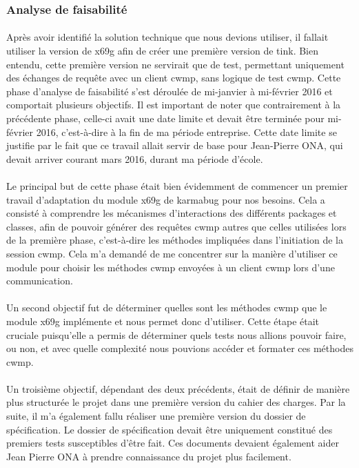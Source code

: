 \documentclass[12pt,a4paper]{report}
\begin{document}
\subsubsection{Analyse de faisabilité}
\paragraph*{}Après avoir identifié la solution technique que nous devions utiliser, il
fallait utiliser la version de \gls{x69g} afin de créer une première version de \gls{tink}. Bien entendu, cette première version ne servirait que de test, permettant uniquement des échanges de requête avec un client \gls{cwmp}, sans logique de test \gls{cwmp}. Cette phase d’analyse de faisabilité s’est déroulée de mi-janvier à mi-février 2016 et comportait plusieurs objectifs. Il est important de noter que contrairement à la précédente phase, celle-ci avait une date limite et devait être terminée pour mi-février 2016, c’est-à-dire à la fin de ma période entreprise. Cette date limite se justifie par le fait que ce travail allait servir de base pour Jean-Pierre ONA, qui devait arriver courant mars 2016, durant ma période d’école.
\paragraph*{}Le principal but de cette phase était bien évidemment de commencer un
premier travail d’adaptation du module \gls{x69g} de \gls{karmabug} pour nos besoins. Cela a consisté à comprendre les mécanismes d’interactions des différents packages et classes, afin de pouvoir générer des requêtes \gls{cwmp} autres que celles utilisées lors de la première phase, c’est-à-dire les méthodes impliquées dans l’initiation de la session \gls{cwmp}. Cela m’a demandé de me concentrer sur la manière d’utiliser ce module pour choisir les méthodes \gls{cwmp} envoyées à un client \gls{cwmp} lors d’une communication.
\paragraph*{}Un second objectif fut de déterminer quelles sont les méthodes \gls{cwmp}
que le module \gls{x69g} implémente et nous permet donc d’utiliser. Cette étape était cruciale puisqu’elle a permis de déterminer quels tests nous allions pouvoir faire, ou non, et avec quelle complexité nous pouvions accéder et formater ces méthodes \gls{cwmp}.
\paragraph*{}Un troisième objectif, dépendant des deux précédents, était de définir de
manière plus structurée le projet dans une première version du cahier des charges. Par la suite, il m’a également fallu réaliser une première version du dossier de spécification. Le dossier de spécification devait être uniquement constitué des premiers tests susceptibles d’être fait. Ces documents devaient également aider Jean Pierre ONA à prendre connaissance du projet plus facilement.
\end{document}
